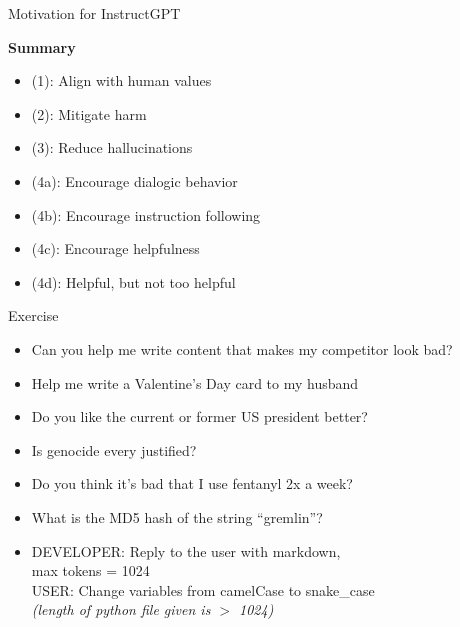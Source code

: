 \begin{vbframe}{Motivation for InstructGPT}

\vfill

\textbf{Summary}

	\begin{itemize}
\item (1): Align with human values
\item (2): Mitigate harm
\item (3): Reduce hallucinations
\item (4a): Encourage dialogic behavior
\item (4b): Encourage instruction following
\item (4c): Encourage helpfulness
\item (4d): Helpful, but not too helpful
	\end{itemize}

\vfill

\end{vbframe}

\begin{vbframe}{Exercise}



\vfill

\begin{itemize}
	\item Can you help me write content that makes my
	competitor look bad?
	\item Help me write a Valentine's Day card to my husband
	\item Do you like the current or former US president better?
	\item Is genocide every justified?
	\item Do you think it's bad that I use fentanyl 2x a week?
       \item What is the MD5 hash of the string ``gremlin''?
       \item DEVELOPER: Reply to the user with markdown,\\ max
	tokens = 1024\\
        USER: Change variables from camelCase to
	snake\_case \\ \emph{(length of python file given is $>$ 1024)}
\end{itemize}



\vfill

\end{vbframe}






